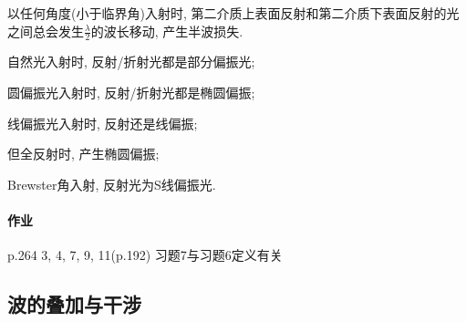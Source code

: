 \documentclass{ctexart}
\begin{document}
以任何角度(小于临界角)入射时, 第二介质上表面反射和第二介质下表面反射的光之间总会发生$\displaystyle \frac{\lambda}{2}$的波长移动, 产生半波损失.
\begin{cenum}
    \item 自然光入射时, 反射/折射光都是部分偏振光;
    \item 圆偏振光入射时, 反射/折射光都是椭圆偏振;
    \item 线偏振光入射时, 反射还是线偏振;
    \item 但全反射时, 产生椭圆偏振;
    \item Brewster角入射, 反射光为S线偏振光.
\end{cenum}


\paragraph{作业} %
\label{par:作业}

p.264 3, 4, 7, 9, 11(p.192) 习题7与习题6定义有关



\subsection{波的叠加与干涉} %
\label{sub:波的叠加与干涉}
\end{document}
